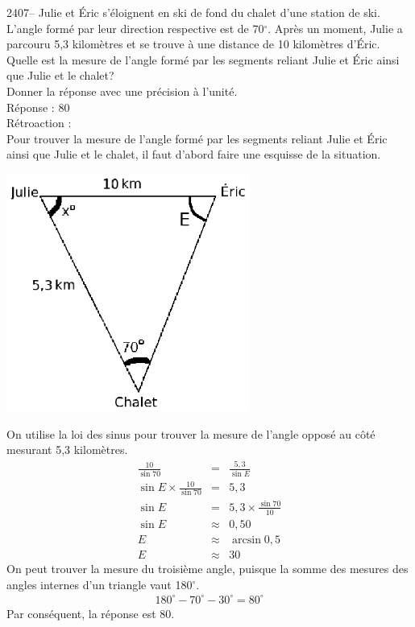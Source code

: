 \documentclass[letterpaper, 12pt]{article}
\begin{document}
2407-- Julie et \'Eric s'\'eloignent en ski de fond du chalet d'une station de ski. L'angle form\'e par leur direction respective est de 70$^{\circ}$. Apr\`es un moment, Julie a parcouru 5,3 kilom\`etres et se trouve \`a une distance de 10 kilom\`etres d'\'Eric. Quelle est la mesure de l'angle form\'e par les segments reliant Julie et \'Eric ainsi que Julie et le chalet? \\
Donner la r\'eponse avec une pr\'ecision \`a l'unit\'e.\\

R\'eponse : 80\\

R\'etroaction :\\
Pour trouver la mesure de l'angle form\'e par les segments reliant Julie et \'Eric ainsi que Julie et le chalet, il faut d'abord faire une esquisse de la situation.
\begin{center}
 \includegraphics[width=8cm,bb=14 14 232 185]{Q2407.eps}
\end{center}
On utilise la loi des sinus pour trouver la mesure de l'angle oppos\'e au c\^ot\'e mesurant 5,3 kilom\`etres.
\begin{eqnarray*}
 \frac{10}{\sin{70}}&=&\frac{5,3}{\sin{E}}\\[2mm]
 \sin{E}\times \frac{10}{\sin{70}}&=&5,3\\[2mm]
 \sin{E}&=&5,3\times \frac{\sin{70}}{10}\\[2mm]
 \sin{E}&\approx&0,50\\
 E&\approx&\arcsin{0,5}\\
 E&\approx&30
\end{eqnarray*}
On peut trouver la mesure du troisi\`eme angle, puisque la somme des mesures des angles internes d'un triangle vaut 180$^{\circ}$.
\begin{eqnarray*}
 180^{\circ}-70^{\circ}-30^{\circ}=80^{\circ}
\end{eqnarray*}
Par cons\'equent, la r\'eponse est 80.\\
\end{document}
